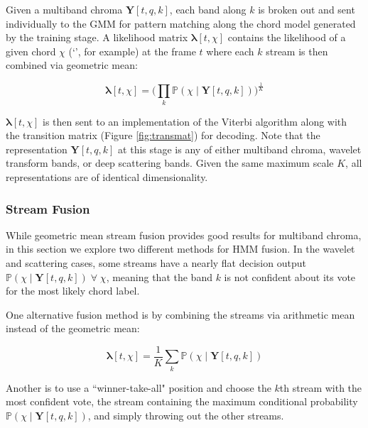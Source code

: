 Given a multiband chroma $\mathbf{Y}[t,q,k]$, each band along $k$ is broken out and sent individually to the GMM for pattern matching along the chord model generated by the training stage. A likelihood matrix $\mathbf{\lambda}[t,\chi]$ contains the likelihood of a given chord $\chi$ (`\Amin', for example) at the frame $t$ where each $k$ stream is then combined via geometric mean:

\begin{equation}
\mathbf{\lambda}[t,\chi] = \Big ( \prod_{k} \mathds{P}(\chi \mid \mathbf{Y}[t,q,k]) \Big)^{\frac{1}{K}}
\end{equation}

$\mathbf{\lambda}[t,\chi]$ is then sent to an implementation of the Viterbi algorithm along with the transition matrix (Figure \ref{fig:transmat}) for decoding. Note that the representation $\mathbf{Y}[t,q,k]$ at this stage is any of either multiband chroma, wavelet transform bands, or deep scattering bands. Given the same maximum scale $K$, all representations are of identical dimensionality.

\subsubsection{Stream Fusion}
\label{sec:fusion}

While geometric mean stream fusion provides good results for multiband chroma, in this section we explore two different methods for HMM fusion. In the wavelet and scattering cases, some streams have a nearly flat decision output $\mathds{P}(\chi \mid \mathbf{Y}[t,q,k]) \; \forall \; \chi$, meaning that the band $k$ is not confident about its vote for the most likely chord label. 

One alternative fusion method is by combining the streams via arithmetic mean instead of the geometric mean:

\begin{equation}
\mathbf{\lambda}[t,\chi] = \frac{1}{K}\sum_{k} \mathds{P}(\chi \mid \mathbf{Y}[t,q,k]) 
\end{equation}

Another is to use a ``winner-take-all" position and choose the $k$th stream with the most confident vote, \ie the stream containing the maximum conditional probability $\mathds{P}(\chi \mid \mathbf{Y}[t,q,k])$, and simply throwing out the other streams.

